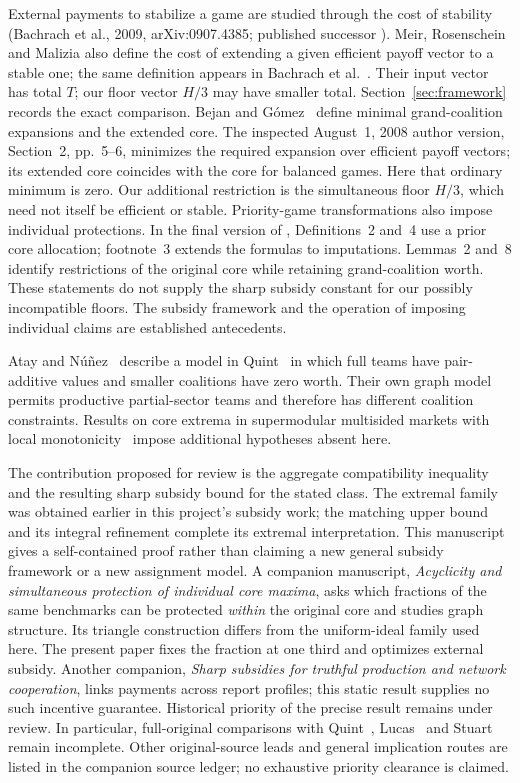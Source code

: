 \documentclass[11pt]{article}
\theoremstyle{remark}
\begin{document}
External payments to stabilize a game are studied through the cost of
stability (Bachrach et al., 2009, arXiv:0907.4385; published successor
\citep{Bachrach2018}). Meir, Rosenschein and Malizia
\citep[Section~2.2]{Meir2011} also define the cost of extending a given
efficient payoff vector to a stable one; the same definition appears in
Bachrach et al.~\citep[Section~5]{Bachrach2018}. Their input vector has total $T$;
our floor vector $H/3$ may have smaller total. Section~\ref{sec:framework}
records the exact comparison. Bejan and G\'omez~\citep{BejanGomez2009} define minimal grand-coalition
expansions and the extended core. The inspected August~1, 2008 author
version, Section~2, pp.~5--6, minimizes the required expansion over efficient
payoff vectors; its extended core coincides with the core for balanced games.
Here that ordinary minimum is zero. Our additional restriction is the
simultaneous floor $H/3$, which need not itself be efficient or stable.
Priority-game transformations also impose individual protections.
In the final version of \citet{Priority2024}, Definitions~2 and~4 use a
prior core allocation; footnote~3 extends the formulas to imputations.
Lemmas~2 and~8 identify restrictions of the original core while retaining
grand-coalition worth. These statements do not supply the sharp
subsidy constant for our possibly incompatible floors. The subsidy framework
and the operation of imposing individual claims are established antecedents.

Atay and N\'u\~nez~\citep[p.~273]{AtayNunez2019} describe a model in
Quint~\citep{Quint1991} in which full teams have pair-additive values and
smaller coalitions have zero worth. Their own graph model permits productive
partial-sector teams and therefore has different coalition constraints.
Results on core extrema in supermodular multisided markets with local
monotonicity~\citep{Martinez2026} impose additional hypotheses absent here.

The contribution proposed for review is the aggregate compatibility
inequality and the resulting sharp subsidy bound for the stated class.
The extremal family was obtained earlier in this project's subsidy work;
the matching upper bound and its integral refinement complete its extremal
interpretation. This manuscript gives a self-contained proof rather than
claiming a new general subsidy framework or a new assignment model.
A companion manuscript, \emph{Acyclicity and simultaneous protection of
individual core maxima}, asks which fractions of the same benchmarks can
be protected \emph{within} the original core and studies graph structure.
Its triangle construction differs from the uniform-ideal family used here.
The present paper fixes the fraction at one third and optimizes external
subsidy. Another companion, \emph{Sharp subsidies for truthful production
and network cooperation}, links payments across report profiles; this
static result supplies no such incentive guarantee.
Historical priority of the precise result remains under review. In
particular, full-original comparisons with Quint~\citep{Quint1991},
Lucas~\citep{Lucas1995} and Stuart~\citep{Stuart1997} remain incomplete.
Other original-source leads and general implication routes are listed in
the companion source ledger; no exhaustive priority clearance is claimed.
\end{document}
